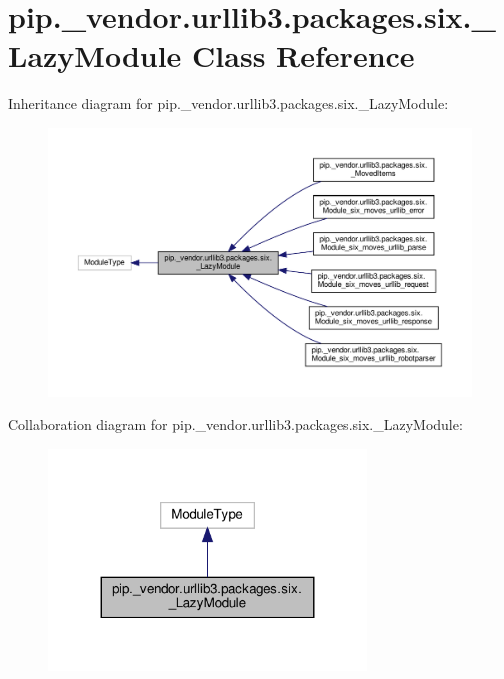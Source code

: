 \hypertarget{classpip_1_1__vendor_1_1urllib3_1_1packages_1_1six_1_1__LazyModule}{}\section{pip.\+\_\+vendor.\+urllib3.\+packages.\+six.\+\_\+\+Lazy\+Module Class Reference}
\label{classpip_1_1__vendor_1_1urllib3_1_1packages_1_1six_1_1__LazyModule}


Inheritance diagram for pip.\+\_\+vendor.\+urllib3.\+packages.\+six.\+\_\+\+Lazy\+Module\+:
\nopagebreak
\begin{figure}[H]
\begin{center}
\leavevmode
\includegraphics[width=350pt]{classpip_1_1__vendor_1_1urllib3_1_1packages_1_1six_1_1__LazyModule__inherit__graph}
\end{center}
\end{figure}


Collaboration diagram for pip.\+\_\+vendor.\+urllib3.\+packages.\+six.\+\_\+\+Lazy\+Module\+:
\nopagebreak
\begin{figure}[H]
\begin{center}
\leavevmode
\includegraphics[width=239pt]{classpip_1_1__vendor_1_1urllib3_1_1packages_1_1six_1_1__LazyModule__coll__graph}
\end{center}
\end{figure}
